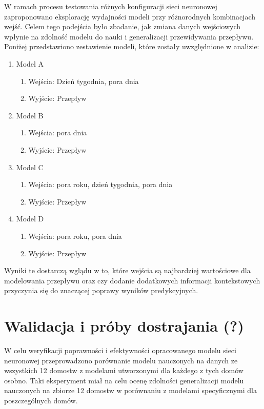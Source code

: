 \documentclass[a4paper,twoside,12pt]{book}
\begin{document}
W ramach procesu testowania różnych konfiguracji sieci neuronowej zaproponowano eksplorację wydajności modeli przy różnorodnych kombinacjach wejść. Celem tego podejścia było zbadanie, jak zmiana danych wejściowych wpłynie na zdolność modelu do nauki i generalizacji przewidywania przepływu. Poniżej przedstawiono zestawienie modeli, które zostały uwzględnione w analizie:

\begin{enumerate}
	\item Model A
	      \begin{enumerate}
		      \item Wejścia: Dzień tygodnia, pora dnia
		      \item Wyjście: Przepływ
	      \end{enumerate}
	\item Model B
	      \begin{enumerate}
		      \item Wejścia: pora dnia
		      \item Wyjście: Przepływ
	      \end{enumerate}
	\item Model C
	      \begin{enumerate}
		      \item Wejścia: pora roku, dzień tygodnia, pora dnia
		      \item Wyjście: Przepływ
	      \end{enumerate}
	\item Model D
	      \begin{enumerate}
		      \item Wejścia: pora roku, pora dnia
		      \item Wyjście: Przepływ
	      \end{enumerate}
\end{enumerate}

Wyniki te dostarczą wglądu w to, które wejścia są najbardziej wartościowe dla modelowania przepływu oraz czy dodanie dodatkowych informacji kontekstowych przyczynia się do znaczącej poprawy wyników predykcyjnych.
\newpage

\section{Walidacja i próby dostrajania (?)}
W celu weryfikacji poprawności i efektywności opracowanego modelu sieci neuronowej przeprowadzono porównanie modelu nauczonych na danych ze wszystkich 12 domostw z modelami utworzonymi dla każdego z tych domów osobno. Taki eksperyment miał na celu ocenę zdolności generalizacji modelu nauczonych na zbiorze 12 domostw w porównaniu z modelami specyficznymi dla poszczególnych domów.
\end{document}
